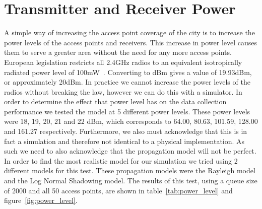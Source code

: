     \section{Transmitter and Receiver Power}\label{data_gathering_performance_transmitter_and_reciever_power}

        A simple way of increasing the access point coverage of the city is to increase the power levels of the access points and receivers. This increase in power level causes them to serve a greater area without the need for any more access points. European legislation restricts all 2.4GHz radios to an equivalent isotropically radiated power level of 100mW~\cite{rackley2011wireless}. Converting to dBm gives a value of 19.93dBm, or approximately 20dBm. In practice we cannot increase the power levels of the radios without breaking the law, however we can do this with a simulator. In order to determine the effect that power level has on the data collection performance we tested the model at 5 different power levels. These power levels were 18, 19, 20, 21 and 22 dBm, which corresponds to 64.00, 80.63, 101.59, 128.00 and 161.27 respectively. Furthermore, we also must acknowledge that this is in fact a simulation and therefore not identical to a physical implementation. As such we need to also acknowledge that the propagation model will not be perfect. In order to find the most realistic model for our simulation we tried using 2 different models for this test. These propagation models were the Rayleigh model and the Log Normal Shadowing model. The results of this test, using a queue size of 2000 and all 50 access points, are shown in table~\ref{tab:power_level} and figure~\ref{fig:power_level}. 

